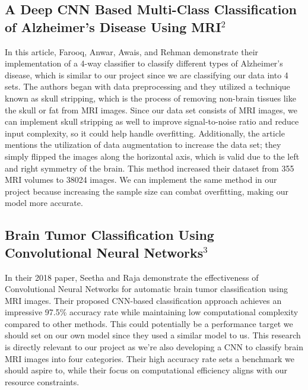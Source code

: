 \documentclass[conference]{IEEEtran}
\begin{document}
\subsection{\large A Deep CNN Based Multi-Class Classification of Alzheimer's Disease Using MRI$^{2}$}

In this article, Farooq, Anwar, Awais, and Rehman demonstrate their implementation of a 4-way classifier to classify different types of Alzheimer's disease, which is similar to our project since we are classifying our data into 4 sets. The authors began with data preprocessing and they utilized a technique known as skull stripping, which is the process of removing non-brain tissues like the skull or fat from MRI images. Since our data set consists of MRI images, we can implement skull stripping as well to improve signal-to-noise ratio and reduce input complexity, so it could help handle overfitting. Additionally, the article mentions the utilization of data augmentation to increase the data set; they simply flipped the images along the horizontal axis, which is valid due to the left and right symmetry of the brain. This method increased their dataset from 355 MRI volumes to 38024 images. We can implement the same method in our project because increasing the sample size can combat overfitting, making our model more accurate.

\subsection{\large Brain Tumor Classification Using Convolutional Neural Networks$^{3}$}

In their 2018 paper, Seetha and Raja demonstrate the effectiveness of Convolutional Neural Networks for automatic brain tumor classification using MRI images. Their proposed CNN-based classification approach achieves an impressive 97.5\% accuracy rate while maintaining low computational complexity compared to other methods. This could potentially be a performance target we should set on our own model since they used a similar model to us. This research is directly relevant to our project as we're also developing a CNN to classify brain MRI images into four categories. Their high accuracy rate sets a benchmark we should aspire to, while their focus on computational efficiency aligns with our resource constraints. 
\end{document}
